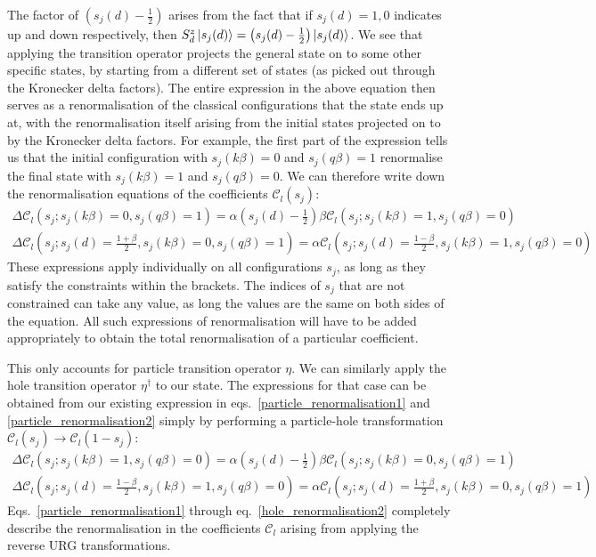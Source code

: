The factor of \(\left(s_j(d) - \frac{1}{2}\right)\) arises from the fact that if \(s_j(d)=1,0\) indicates up and down respectively, then \(S_d^z\ket{s_j(d)} = \left(s_j(d) - \frac{1}{2}\right)\ket{s_j(d)}\). We see that applying the transition operator projects the general state on to some other specific states, by starting from a different set of states (as picked out through the Kronecker delta factors). The entire expression in the above equation then serves as a renormalisation of the classical configurations that the state ends up at, with the renormalisation itself arising from the initial states projected on to by the Kronecker delta factors. For example, the first part of the expression tells us that the initial configuration with \(s_j(k\beta) = 0\) and \(s_j(q\beta)=1\) renormalise the final state with \(s_j(k\beta)=1\) and \(s_j(q\beta)=0\). We can therefore write down the renormalisation equations of the coefficients \(\mathcal{C}_l(s_j)\):
\begin{gather}
	\Delta \mathcal{C}_l\left(s_j;s_j(k\beta) = 0,s_j(q\beta)=1\right) = \alpha \left(s_j(d) - \frac{1}{2}\right) \beta \mathcal{C}_l\left(s_j;s_j(k\beta) = 1,s_j(q\beta)=0\right)\label{particle_renormalisation1}\\
	\Delta \mathcal{C}_l\left(s_j;s_j(d) = \frac{1 + \beta}{2}, s_j(k\beta) = 0, s_j(q\beta)=1\right) = \alpha \mathcal{C}_l\left(s_j;s_j(d) = \frac{1 - \beta}{2}, s_j(k\beta) = 1,s_j(q\beta)=0\right)\label{particle_renormalisation2}
\end{gather}
These expressions apply individually on all configurations \(s_j\), as long as they satisfy the constraints within the brackets. The indices of \(s_j\) that are not constrained can take any value, as long the values are the same on both sides of the equation. All such expressions of renormalisation will have to be added appropriately to obtain the total renormalisation of a particular coefficient.

This only accounts for particle transition operator \(\eta\). We can similarly apply the hole transition operator \(\eta^\dagger\) to our state. The expressions for that case can be obtained from our existing expression in eqs.~\ref{particle_renormalisation1} and \ref{particle_renormalisation2} simply by performing a particle-hole transformation \(\mathcal{C}_l(s_j) \to \mathcal{C}_l(1 - s_j)\):
\begin{gather}
	\Delta \mathcal{C}_l\left(s_j;s_j(k\beta) = 1,s_j(q\beta)=0\right) = \alpha \left(s_j(d) - \frac{1}{2}\right) \beta \mathcal{C}_l\left(s_j;s_j(k\beta) = 0,s_j(q\beta)=1\right)\label{hole_renormalisation1}\\
	\Delta \mathcal{C}_l\left(s_j;s_j(d) = \frac{1 - \beta}{2}, s_j(k\beta) = 1, s_j(q\beta)=0\right) = \alpha \mathcal{C}_l\left(s_j;s_j(d) = \frac{1 + \beta}{2}, s_j(k\beta) = 0,s_j(q\beta)=1\right)\label{hole_renormalisation2}
\end{gather}
Eqs.~\ref{particle_renormalisation1} through eq.~\ref{hole_renormalisation2} completely describe the renormalisation in the coefficients \(\mathcal{C}_l\) arising from applying the reverse URG transformations.


